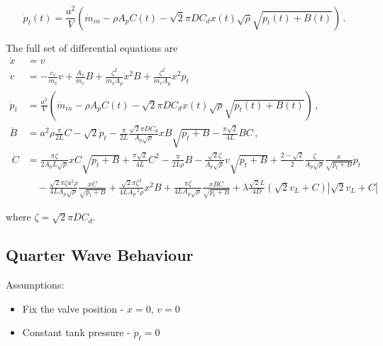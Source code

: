 \begin{equation*}
    \dot{p}_t(t) = \frac{a^2}{V} \left( \dot{m}_{in} - \rho A_p C(t) - \sqrt{2} \pi D C_d x(t) \sqrt{\rho} \sqrt{p_t(t) + B(t)} \right) \, .
\end{equation*}

The full set of differential equations are
~
\begin{equation*}
\begin{split}
    \dot{x} &= v \\
    \dot{v} &= - \frac{c_v}{m_v} v + \frac{A_v}{m_v} B + \frac{\zeta^2}{m_v A_p} x^2 B + \frac{\zeta^2}{m_v A_p} x^2 p_t \\
    \dot{p}_t &= \frac{a^2}{V} \left( \dot{m}_{in} - \rho A_p C(t) - \sqrt{2} \pi D C_d x(t) \sqrt{\rho} \sqrt{p_t(t) + B(t)} \right) \, , \\
    \dot{B} &= a^2 \rho \frac{\pi}{2L} C - \sqrt{2} \dot{p}_t - \frac{\pi}{2L} \frac{\sqrt{2} \pi D C_d}{A_p \sqrt{\rho}} x B \sqrt{p_t + B} - \frac{\pi \sqrt{2}}{4L} B C \, , \\
    ~
    \dot{C} &=
    \frac{\pi \zeta}{2 A_p L \sqrt{\rho}} x C \sqrt{p_t + B}
    + \frac{\pi \sqrt{2}}{4L} C^2
    - \frac{\pi}{2 L \rho} B
    - \frac{\sqrt{2} \zeta}{A_p \sqrt{\rho}} v \sqrt{p_t + B}
    + \frac{2 - \sqrt{2}}{2} \frac{\zeta}{A_p \sqrt{\rho}} \frac{x}{\sqrt{p_t + B}} \dot{p}_t \\ &\quad %
    - \frac{\sqrt{2}\pi\zeta a^2 \rho}{4 L A_p \sqrt{\rho}} \frac{x C}{\sqrt{p_t + B}}
    + \frac{\sqrt{2}\pi\zeta^2}{4L A_p\,^2 \rho} x^2 B
    + \frac{\pi \zeta}{4 L A_p \sqrt{\rho}} \frac{x B C}{\sqrt{p_t + B}}
    + \lambda \frac{\sqrt{2}L}{4 D} \left( \sqrt{2} v_L + C \right) \left| \sqrt{2} v_L + C \right|
\end{split}
\end{equation*}

where $\zeta = \sqrt{2} \pi D C_d$.

\subsection{Quarter Wave Behaviour}

Assumptions:

\begin{itemize}
    \item Fix the valve position - $x = 0$, $v = 0$
    \item Constant tank pressure - $\dot{p}_t = 0$
\end{itemize}


